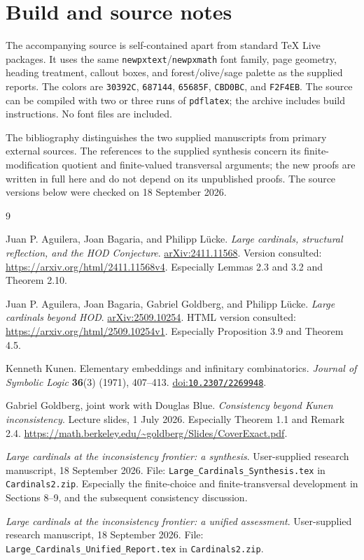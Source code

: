 \documentclass[11pt,letterpaper]{article}
\theoremstyle{definition}
\newcommand{\arxiv}[1]{\href{https://arxiv.org/abs/#1}{arXiv:#1}}
\newcommand{\doi}[1]{\href{https://doi.org/#1}{doi:\nolinkurl{#1}}}
\numberwithin{equation}{section}
\begin{document}
\section{Build and source notes}\label{app:build}

The accompanying source is self-contained apart from standard TeX Live
packages. It uses the same \texttt{newpxtext}/\texttt{newpxmath} font family,
page geometry, heading treatment, callout boxes, and forest/olive/sage palette
as the supplied reports. The colors are \texttt{30392C}, \texttt{687144},
\texttt{65685F}, \texttt{CBD0BC}, and \texttt{F2F4EB}.
The source can be compiled with two or three runs of \texttt{pdflatex}; the
archive includes build instructions. No font files are included.

The bibliography distinguishes the two supplied manuscripts from primary
external sources. The references to the supplied synthesis concern its
finite-modification quotient and finite-valued transversal arguments; the
new proofs are written in full here and do not depend on its unpublished
proofs. The source versions below were checked on 18 September 2026.

\begin{thebibliography}{9}

Juan P. Aguilera, Joan Bagaria, and Philipp L\"ucke.
\emph{Large cardinals, structural reflection, and the HOD Conjecture}.
\arxiv{2411.11568}. Version consulted:
\url{https://arxiv.org/html/2411.11568v4}.
Especially Lemmas 2.3 and 3.2 and Theorem 2.10.

Juan P. Aguilera, Joan Bagaria, Gabriel Goldberg, and Philipp L\"ucke.
\emph{Large cardinals beyond HOD}.
\arxiv{2509.10254}. HTML version consulted:
\url{https://arxiv.org/html/2509.10254v1}.
Especially Proposition 3.9 and Theorem 4.5.

Kenneth Kunen.
Elementary embeddings and infinitary combinatorics.
\emph{Journal of Symbolic Logic} \textbf{36}(3) (1971), 407--413.
\doi{10.2307/2269948}.

Gabriel Goldberg, joint work with Douglas Blue.
\emph{Consistency beyond Kunen inconsistency}.
Lecture slides, 1 July 2026. Especially Theorem 1.1 and Remark 2.4.
\url{https://math.berkeley.edu/~goldberg/Slides/CoverExact.pdf}.

\emph{Large cardinals at the inconsistency frontier: a synthesis}.
User-supplied research manuscript, 18 September 2026.
File: \nolinkurl{Large_Cardinals_Synthesis.tex} in \texttt{Cardinals2.zip}.
Especially the finite-choice and finite-transversal development in
Sections 8--9, and the subsequent consistency discussion.

\emph{Large cardinals at the inconsistency frontier: a unified assessment}.
User-supplied research manuscript, 18 September 2026.
File: \nolinkurl{Large_Cardinals_Unified_Report.tex} in \texttt{Cardinals2.zip}.

\end{thebibliography}
\end{document}

